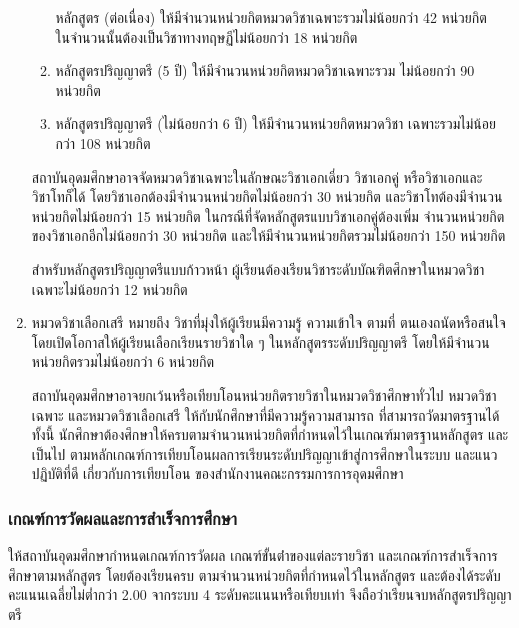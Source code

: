 \begin{enumerate}
\begin{enumerate}
    หลักสูตร (ต่อเนื่อง) ให้มีจํานวนหน่วยกิตหมวดวิชาเฉพาะรวมไม่น้อยกว่า 42 หน่วยกิต ในจํานวนนั้นต้องเป็นวิชาทางทฤษฏีไม่น้อยกว่า 18 หน่วยกิต

    \item หลักสูตรปริญญาตรี (5 ปี) ให้มีจํานวนหน่วยกิตหมวดวิชาเฉพาะรวม ไม่น้อยกว่า 90 หน่วยกิต

    \item หลักสูตรปริญญาตรี (ไม่น้อยกว่า 6 ปี) ให้มีจํานวนหน่วยกิตหมวดวิชา เฉพาะรวมไม่น้อยกว่า 108 หน่วยกิต
    \end{enumerate}

    สถาบันอุดมศึกษาอาจจัดหมวดวิชาเฉพาะในลักษณะวิชาเอกเดี่ยว วิชาเอกคู่ หรือวิชาเอกและวิชาโทก็ได้ โดยวิชาเอกต้องมีจํานวนหน่วยกิตไม่น้อยกว่า 30 หน่วยกิต และวิชาโทต้องมีจํานวนหน่วยกิตไม่น้อยกว่า 15 หน่วยกิต ในกรณีที่จัดหลักสูตรแบบวิชาเอกคู่ต้องเพิ่ม จํานวนหน่วยกิตของวิชาเอกอีกไม่น้อยกว่า 30 หน่วยกิต และให้มีจํานวนหน่วยกิตรวมไม่น้อยกว่า 150 หน่วยกิต
		
    สําหรับหลักสูตรปริญญาตรีแบบก้าวหน้า ผู้เรียนต้องเรียนวิชาระดับบัณฑิตศึกษาในหมวดวิชาเฉพาะไม่น้อยกว่า 12 หน่วยกิต 




    \item หมวดวิชาเลือกเสรี หมายถึง วิชาที่มุ่งให้ผู้เรียนมีความรู้ ความเข้าใจ ตามที่ ตนเองถนัดหรือสนใจ โดยเปิดโอกาสให้ผู้เรียนเลือกเรียนรายวิชาใด ๆ ในหลักสูตรระดับปริญญาตรี โดยให้มีจํานวนหน่วยกิตรวมไม่น้อยกว่า 6 หน่วยกิต
   
    สถาบันอุดมศึกษาอาจยกเว้นหรือเทียบโอนหน่วยกิตรายวิชาในหมวดวิชาศึกษาทั่วไป หมวดวิชาเฉพาะ และหมวดวิชาเลือกเสรี ให้กับนักศึกษาที่มีความรู้ความสามารถ ที่สามารถวัดมาตรฐานได้ ทั้งนี้ นักศึกษาต้องศึกษาให้ครบตามจํานวนหน่วยกิตที่กําหนดไว้ในเกณฑ์มาตรฐานหลักสูตร และเป็นไป ตามหลักเกณฑ์การเทียบโอนผลการเรียนระดับปริญญาเข้าสู่การศึกษาในระบบ และแนวปฏิบัติที่ดี เกี่ยวกับการเทียบโอน ของสํานักงานคณะกรรมการการอุดมศึกษา


\end{enumerate}



\subsubsection{เกณฑ์การวัดผลและการสําเร็จการศึกษา}

ให้สถาบันอุดมศึกษากําหนดเกณฑ์การวัดผล เกณฑ์ขั้นต่ําของแต่ละรายวิชา และเกณฑ์การสําเร็จการศึกษาตามหลักสูตร โดยต้องเรียนครบ ตามจํานวนหน่วยกิตที่กําหนดไว้ในหลักสูตร และต้องได้ระดับคะแนนเฉลี่ยไม่ตํ่ากว่า 2.00 จากระบบ 4 ระดับคะแนนหรือเทียบเท่า จึงถือว่าเรียนจบหลักสูตรปริญญาตรี 
